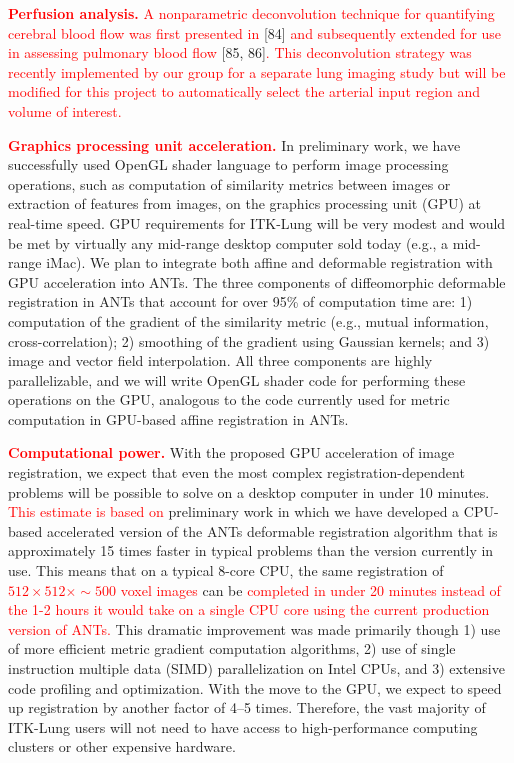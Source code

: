 \documentclass[11pt,]{article}
\begin{document}
\textbf{\textcolor{red}{Perfusion analysis.}}
\textcolor{red}{A nonparametric deconvolution technique for quantifying cerebral blood
flow was first presented in} {[}84{]}
\textcolor{red}{and subsequently extended for use in assessing
pulmonary blood flow} {[}85,
86{]}\textcolor{red}{.  This deconvolution strategy was recently
implemented by our group for a separate lung imaging study but will be modified for this
project to automatically select the arterial input region and volume of interest.}

\textbf{\textcolor{red}{Graphics processing unit acceleration.}} In
preliminary work, we have successfully used OpenGL shader language to
perform image processing operations, such as computation of similarity
metrics between images or extraction of features from images, on the
graphics processing unit (GPU) at real-time speed. GPU requirements for
ITK-Lung will be very modest and would be met by virtually any mid-range
desktop computer sold today (e.g., a mid-range iMac). We plan to
integrate both affine and deformable registration with GPU acceleration
into ANTs. The three components of diffeomorphic deformable registration
in ANTs that account for over 95\% of computation time are: 1)
computation of the gradient of the similarity metric (e.g., mutual
information, cross-correlation); 2) smoothing of the gradient using
Gaussian kernels; and 3) image and vector field interpolation. All three
components are highly parallelizable, and we will write OpenGL shader
code for performing these operations on the GPU, analogous to the code
currently used for metric computation in GPU-based affine registration
in ANTs.

\textbf{\textcolor{red}{Computational power.}} With the proposed GPU
acceleration of image registration, we expect that even the most complex
registration-dependent problems will be possible to solve on a desktop
computer in under 10 minutes. \textcolor{red}{This estimate is based on}
preliminary work in which we have developed a CPU-based accelerated
version of the ANTs deformable registration algorithm that is
approximately 15 times faster in typical problems than the version
currently in use. This means that on a typical 8-core CPU, the same
registration of
\textcolor{red}{$512 \times 512 \times {\sim}500$ voxel images} can be
\textcolor{red}{completed in under 20 minutes
instead of the 1-2 hours it would take on a single CPU core using the current production version of ANTs.}
This dramatic improvement was made primarily though 1) use of more
efficient metric gradient computation algorithms, 2) use of single
instruction multiple data (SIMD) parallelization on Intel CPUs, and 3)
extensive code profiling and optimization. With the move to the GPU, we
expect to speed up registration by another factor of 4--5 times.
Therefore, the vast majority of ITK-Lung users will not need to have
access to high-performance computing clusters or other expensive
hardware.
\end{document}
